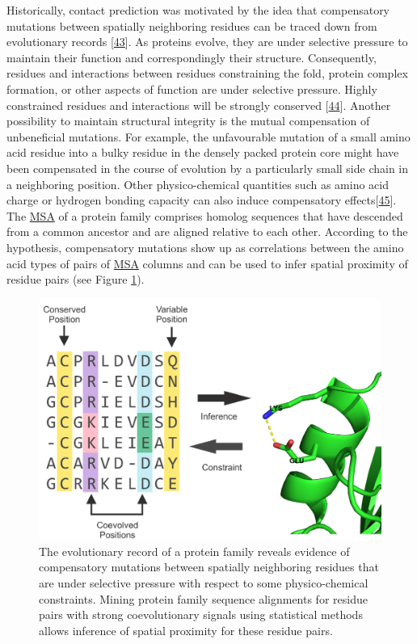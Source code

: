 \documentclass[11pt,a4paper,twoside]{book}
\theoremstyle{definition}
\theoremstyle{definition}
\theoremstyle{remark}
\begin{document}
Historically, contact prediction was motivated by the idea that
compensatory mutations between spatially neighboring residues can be
traced down from evolutionary records
{[}\protect\hyperlink{ref-Gobel1994}{43}{]}. As proteins evolve, they
are under selective pressure to maintain their function and
correspondingly their structure. Consequently, residues and interactions
between residues constraining the fold, protein complex formation, or
other aspects of function are under selective pressure. Highly
constrained residues and interactions will be strongly conserved
{[}\protect\hyperlink{ref-Godzik1989}{44}{]}. Another possibility to
maintain structural integrity is the mutual compensation of unbeneficial
mutations. For example, the unfavourable mutation of a small amino acid
residue into a bulky residue in the densely packed protein core might
have been compensated in the course of evolution by a particularly small
side chain in a neighboring position. Other physico-chemical quantities
such as amino acid charge or hydrogen bonding capacity can also induce
compensatory effects{[}\protect\hyperlink{ref-Neher1994}{45}{]}. The
\protect\hyperlink{abbrev}{MSA} of a protein family comprises homolog
sequences that have descended from a common ancestor and are aligned
relative to each other. According to the hypothesis, compensatory
mutations show up as correlations between the amino acid types of pairs
of \protect\hyperlink{abbrev}{MSA} columns and can be used to infer
spatial proximity of residue pairs (see Figure
\ref{fig:correlated-mutations}).









\begin{figure}

{\centering \includegraphics[width=0.9\linewidth]{img/intro/correlated-mutations-transparent} 

}

\caption{The evolutionary record of a protein
family reveals evidence of compensatory mutations between spatially
neighboring residues that are under selective pressure with respect to
some physico-chemical constraints. Mining protein family sequence
alignments for residue pairs with strong coevolutionary signals using
statistical methods allows inference of spatial proximity for these
residue pairs.}\label{fig:correlated-mutations}
\end{figure}
\end{document}
